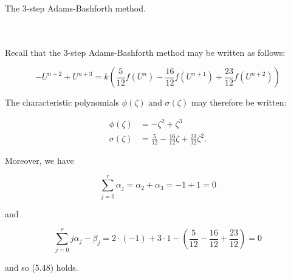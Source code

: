 The 3-step Adams-Bashforth method.

\begin{solution}\ \\\\
    Recall that the 3-step Adams-Bashforth method may be written as follows:

    $$
    -U^{n+2} + U^{n+3} = k \left(\frac{5}{12} f(U^n) - \frac{16}{12} f(U^{n+1}) + \frac{23}{12} f(U^{n+2}) \right)
    $$

    The characteristic polynomials $\phi(\zeta)$ and $\sigma(\zeta)$ may therefore be written:

    \begin{align*}
        \phi(\zeta)   &= -\zeta^2 + \zeta^3 \\
        \sigma(\zeta) &= \frac{5}{12} - \frac{16}{12} \zeta + \frac{23}{12} \zeta^2.
    \end{align*}

    Moreover, we have 
    
    $$
    \sum\limits_{j=0}^{r}{\alpha_j = \alpha_2 + \alpha_3} = -1 + 1 = 0
    $$

    and 
    
    $$
    \sum\limits_{j=0}^{r}{j \alpha_j - \beta_j} = 2 \cdot (-1) + 3 \cdot 1 - \left(\frac{5}{12} - \frac{16}{12} + \frac{23}{12} \right) = 0
    $$

    and so (5.48) holds.

    \ \\
\end{solution}